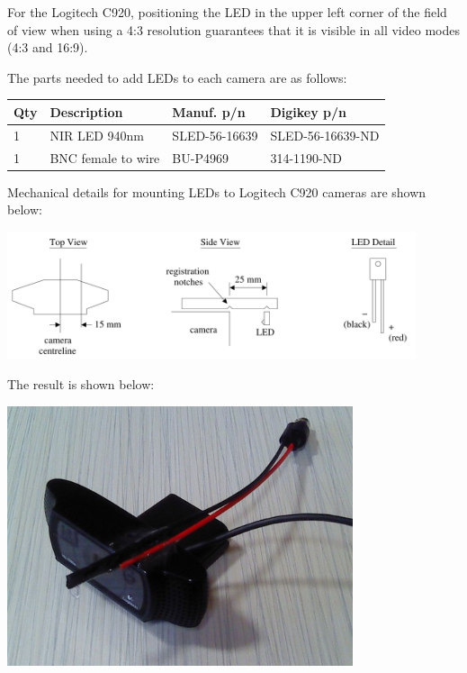 For the Logitech C920, positioning the LED in the upper left corner of the
field of view when using a 4:3 resolution guarantees that it is visible in
all video modes (4:3 and 16:9).

The parts needed to add LEDs to each camera are as follows:

\begin{tabular}{llll}\hline
Qty & Description & Manuf. p/n & Digikey p/n \\
\hline
1 & NIR LED 940nm & SLED-56-16639 & SLED-56-16639-ND \\
1 & BNC female to wire & BU-P4969 & 314-1190-ND \\
\hline
\end{tabular}

Mechanical details for mounting LEDs to Logitech C920 cameras are shown
below:

\includegraphics[width=0.9\textwidth]{figs/maint-led-920.pdf}

The result is shown below:
\begin{center}
\includegraphics[height=3in]{pics-cam/c920-led.jpg}
\end{center}

%
